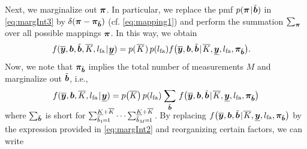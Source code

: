 \documentclass[11pt,a4paper]{article}
\newcommand{\ist}{\hspace*{.3mm}}
\newcommand{\rmv}{\hspace*{-.3mm}}
\newcommand{\nn}{\nonumber}
\begin{document}
Next, we marginalize out $\bm{\pi}$. In particular, we replace the \ac{pmf} $p( \V{\pi} \ist | \ist \tilde{\V{b}} )$ in \eqref{eq:margInt3} by $\delta (\bm{\pi} - \bm{\pi}_{\tilde{\bm{b}}})$ (cf. \eqref{eq:mapping1}) and perform the summation $\sum_{\bm{\pi}}$ over all possible mappings $\bm{\pi}$. In this way, we obtain
\begin{align}
&f(\overline{\V{y}}, \V{b}, \tilde{\V{b}}, \overline{K}, l_{\mathrm{fa}} \ist | \ist \underline{\V{y}})  = p( \ist \overline{K} \ist)     \ist\ist p(l_{\mathrm{fa}} ) f\big(\overline{\V{y}},\V{b}, \tilde{\V{b}}  \ist | \ist  \overline{K}, \underline{\V{y}}, l_{\mathrm{fa}}, \V{\pi}_{\tilde{\V{b}}} \big) .  \nn
\end{align}
Now, we note that $\bm{\pi}_{\tilde{\bm{b}}}$ implies the total number of measurements  $M$ and marginalize \vspace{2mm} out $\tilde{\bm{b}}$, i.e.,
\begin{align}
&f(\overline{\V{y}}, \V{b}, \overline{K}, l_{\mathrm{fa}} \ist | \ist \underline{\V{y}}) =  p\big( \overline{K} \big)    \ist\ist p(l_{\mathrm{fa}} ) \ist \sum_{\tilde{\V{b}}} \ist\ist f\big(\overline{\V{y}}, \V{b}, \tilde{\V{b}}  \ist | \ist  \overline{K},   \underline{\V{y}}, l_{\mathrm{fa}}, \V{\pi}_{\tilde{\V{b}}}\big)  \nn\\[-9mm]
\nn
\end{align}
where $\sum_{\tilde{\bm{b}}}$ is short for $\sum^{\underline{K} + \overline{K}}_{\tilde{b}_1 \rmv=\rmv1} \cdots \sum^{\underline{K} + \overline{K}}_{\tilde{b}_M \rmv=\rmv1}$. By replacing $f\big(\overline{\V{y}}, \V{b}, \tilde{\V{b}}  \ist | \ist  \overline{K},   \underline{\V{y}}, l_{\mathrm{fa}}, \V{\pi}_{\tilde{\V{b}}}\big) $ by the expression provided in \eqref{eq:margInt2} and reorganizing certain factors, we can write
\end{document}

